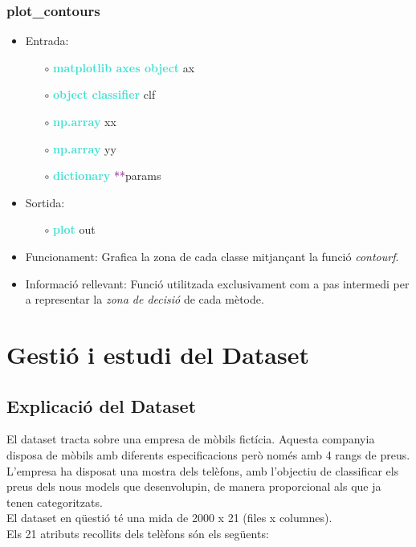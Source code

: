 \documentclass[a4paper, 11pt]{article}
\begin{document}
\subsubsection{plot\_contours}
\begin{itemize}
    \item Entrada:
    \begin{itemize}
        \item [$\circ$] \textbf{\textcolor{Turquoise}{matplotlib axes object}} ax
        \item [$\circ$] \textbf{\textcolor{Turquoise}{object classifier}} clf
        \item [$\circ$]  \textbf{\textcolor{Turquoise}{np.array}} xx
        \item [$\circ$]  \textbf{\textcolor{Turquoise}{np.array}} yy
        \item [$\circ$]  \textbf{\textcolor{Turquoise}{dictionary}} \textcolor{purple}{**}params
    \end{itemize}
    \item Sortida: \begin{itemize}
        \item [$\circ$] \textbf{\textcolor{Turquoise}{plot}} out
    \end{itemize}
    \item Funcionament: Grafica la zona de cada classe mitjançant la funció \textit{contourf}.
    \item Informació rellevant: Funció utilitzada exclusivament com a pas intermedi per a representar la \textit{zona de decisió} de cada mètode.\\ \label{plot_contour}
\end{itemize}
\newpage
\section{Gestió i estudi del Dataset}
\subsection{Explicació del Dataset} \label{exp_dataset}
El dataset tracta sobre una empresa de mòbils fictícia. Aquesta companyia disposa de mòbils amb diferents especificacions però només amb 4 rangs de preus.\\
L'empresa ha disposat una mostra dels telèfons, amb l'objectiu de classificar els preus dels nous models que desenvolupin, de manera proporcional als que ja tenen categoritzats.\\ 
El dataset en qüestió té una mida de 2000 x 21 (files x columnes). \\
Els 21 atributs recollits dels telèfons són els següents:
\end{document}
